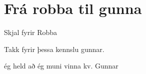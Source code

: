 \section {Frá robba til gunna}

Skjal fyrir Robba

Takk fyrir þessa kennslu gunnar. 

ég held að ég muni vinna kv. Gunnar